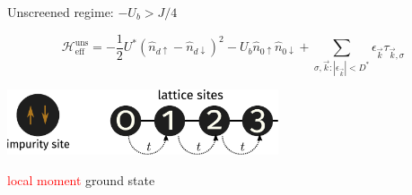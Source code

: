 \documentclass[11pt,aspectratio=169]{beamer}
\newcommand{\focus}[1]{\textcolor{red}{#1}}
\begin{document}
\begin{frame}{Unscreened regime: \(-U_b > J/4 \)}

\[\mathcal{H}_\text{eff}^\text{uns} = -\frac{1}{2}U^*\left(\hat n_{d \uparrow} - \hat n_{d \downarrow}\right)^2 - U_b \hat n_{0 \uparrow} \hat n_{0 \downarrow} + \sum_{\sigma,\vec k:|\epsilon_{\vec k}| < D^*} \epsilon_{\vec k} \tau_{\vec k,\sigma}\]

\includegraphics[width=0.6\textwidth]{figures/local-m.pdf}

\vspace*{\fill}

\focus{local moment} ground state 

\end{frame}
\end{document}
